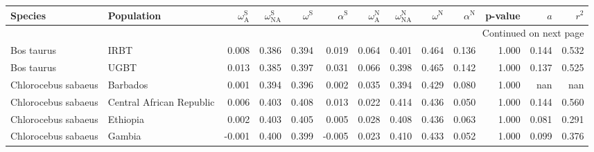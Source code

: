\begin{longtable}{llrrrrrrrrrrr}
\toprule
             Species &                Population & $\omega_{\textrm{A}}^{\textrm{S}}$ & $\omega_{\textrm{NA}}^{\textrm{S}}$ & $\omega^{\textrm{S}}$ & $\alpha^{\textrm{S}}$ & $\omega_{\textrm{A}}^{\textrm{N}}$ & $\omega_{\textrm{NA}}^{\textrm{N}}$ & $\omega^{\textrm{N}}$ & $\alpha^{\textrm{N}}$ & p-value &    $a$ &  $r^2$ \\
\midrule
\endhead
\midrule
\multicolumn{13}{r}{{Continued on next page}} \\
\midrule
\endfoot

\bottomrule
\endlastfoot
          Bos taurus &                      IRBT &                              0.008 &                               0.386 &                 0.394 &                 0.019 &                              0.064 &                               0.401 &                 0.464 &                 0.136 &   1.000 &  0.144 &  0.532 \\
          Bos taurus &                      UGBT &                              0.013 &                               0.385 &                 0.397 &                 0.031 &                              0.066 &                               0.398 &                 0.465 &                 0.142 &   1.000 &  0.137 &  0.525 \\
 Chlorocebus sabaeus &                  Barbados &                              0.001 &                               0.394 &                 0.396 &                 0.002 &                              0.035 &                               0.394 &                 0.429 &                 0.080 &   1.000 &    nan &    nan \\
 Chlorocebus sabaeus &  Central African Republic &                              0.006 &                               0.403 &                 0.408 &                 0.013 &                              0.022 &                               0.414 &                 0.436 &                 0.050 &   1.000 &  0.144 &  0.560 \\
 Chlorocebus sabaeus &                  Ethiopia &                              0.002 &                               0.403 &                 0.405 &                 0.005 &                              0.028 &                               0.408 &                 0.436 &                 0.063 &   1.000 &  0.081 &  0.291 \\
 Chlorocebus sabaeus &                    Gambia &                             -0.001 &                               0.400 &                 0.399 &                -0.005 &                              0.023 &                               0.410 &                 0.433 &                 0.052 &   1.000 &  0.099 &  0.376 \\

\end{longtable}
